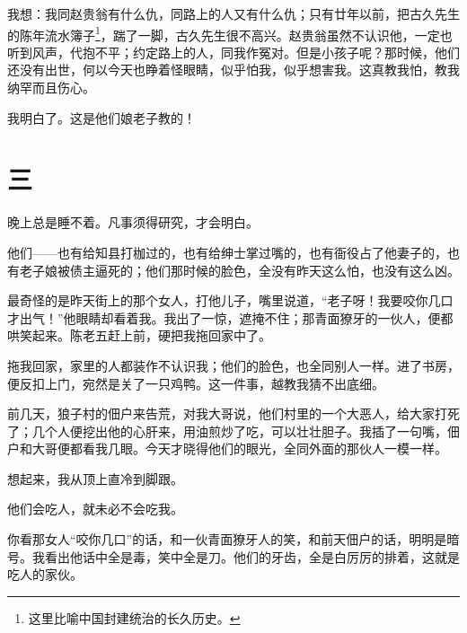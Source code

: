 \documentclass[12pt,UTF8]{ctexbook}
\begin{document}
我想：我同赵贵翁有什么仇，同路上的人又有什么仇；只有廿年以前，把古久先生的陈年流水簿子\footnote{这里比喻中国封建统治的长久历史。}，踹了一脚，古久先生很不高兴。赵贵翁虽然不认识他，一定也听到风声，代抱不平；约定路上的人，同我作冤对。但是小孩子呢？那时候，他们还没有出世，何以今天也睁着怪眼睛，似乎怕我，似乎想害我。这真教我怕，教我纳罕而且伤心。

我明白了。这是他们娘老子教的！

\section{三}

晚上总是睡不着。凡事须得研究，才会明白。

他们——也有给知县打枷过的，也有给绅士掌过嘴的，也有衙役占了他妻子的，也有老子娘被债主逼死的；他们那时候的脸色，全没有昨天这么怕，也没有这么凶。

最奇怪的是昨天街上的那个女人，打他儿子，嘴里说道，“老子呀！我要咬你几口才出气！”他眼睛却看着我。我出了一惊，遮掩不住；那青面獠牙的一伙人，便都哄笑起来。陈老五赶上前，硬把我拖回家中了。

拖我回家，家里的人都装作不认识我；他们的脸色，也全同别人一样。进了书房，便反扣上门，宛然是关了一只鸡鸭。这一件事，越教我猜不出底细。

前几天，狼子村的佃户来告荒，对我大哥说，他们村里的一个大恶人，给大家打死了；几个人便挖出他的心肝来，用油煎炒了吃，可以壮壮胆子。我插了一句嘴，佃户和大哥便都看我几眼。今天才晓得他们的眼光，全同外面的那伙人一模一样。

想起来，我从顶上直冷到脚跟。

他们会吃人，就未必不会吃我。

你看那女人“咬你几口”的话，和一伙青面獠牙人的笑，和前天佃户的话，明明是暗号。我看出他话中全是毒，笑中全是刀。他们的牙齿，全是白厉厉的排着，这就是吃人的家伙。
\end{document}
